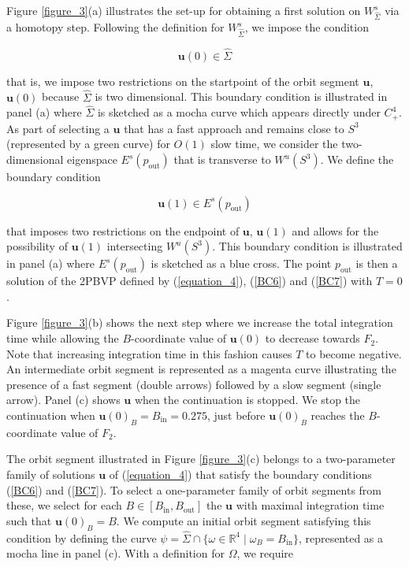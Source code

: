 \documentclass{ws-ijbc}
\begin{document}
Figure \ref{figure_3}(a) illustrates the set-up for obtaining a first solution on $W^s_{\widehat{\Sigma}}$ via a homotopy step.  Following the definition for $W^s_{\widehat{\Sigma}}$, we impose the condition
    
\begin{equation}
\mathbf{u}(0) \in \widehat{\Sigma}
\label{BC6}
\end{equation}
    
 \noindent
that is, we impose two restrictions on the startpoint of the orbit segment $\mathbf{u}$, $\mathbf{u}(0)$ because $\widehat{\Sigma}$ is two dimensional.  This boundary condition is illustrated in panel (a) where $\widehat{\Sigma}$ is sketched as a mocha curve which appears directly under $C^4_+$.  As part of selecting a $\mathbf{u}$ that has a fast approach and remains close to $S^3$ (represented by a green curve) for $O(1)$ slow time, we consider the two-dimensional eigenspace $E^s(p_{\text{out}})$ that is transverse to $W^u(S^3)$.  We define the boundary condition
 
\begin{equation}
\mathbf{u}(1) \in E^s(p_{\text{out}})
\label{BC7}
\end{equation}
    
\noindent
that imposes two restrictions on the endpoint of $\mathbf{u}$, $\mathbf{u}(1)$ and allows for the possibility of $\mathbf{u}(1)$ intersecting $W^u(S^3)$.  This boundary condition is illustrated in panel (a) where $E^s(p_{\text{out}})$ is sketched as a blue cross.  The point $p_{\text{out}}$ is then a solution of the 2PBVP defined by (\ref{equation_4}), (\ref{BC6}) and (\ref{BC7}) with $T=0$.

Figure \ref{figure_3}(b) shows the next step where we increase the total integration time while allowing the $B$-coordinate value of $\mathbf{u}(0)$ to decrease towards $F_2$.  Note that increasing integration time in this fashion causes $T$ to become negative.  An intermediate orbit segment is represented as a magenta curve illustrating the presence of a fast segment (double arrows) followed by a slow segment (single arrow).  Panel (c) shows $\mathbf{u}$ when the continuation is stopped.  We stop the continuation when $\mathbf{u}(0)_B = B_{\text{in}}=0.275$, just before $\mathbf{u}(0)_B$ reaches the $B$-coordinate value of $F_2$.
    
The orbit segment illustrated in Figure \ref{figure_3}(c) belongs to a two-parameter family of solutions $\mathbf{u}$ of (\ref{equation_4}) that satisfy the boundary conditions (\ref{BC6}) and (\ref{BC7}).  To select a one-parameter family of orbit segments from these, we select for each $B \in [B_{\text{in}}, B_{\text{out}}]$ the $\mathbf{u}$ with maximal integration time such that $\mathbf{u}(0)_B=B$.  We compute an initial orbit segment satisfying this condition by defining the curve $\psi = \widehat{\Sigma}\cap \{ \omega \in \mathbb{R}^4 \; | \; \omega_B = B_{\text{in}}\}$, represented as a mocha line in panel (c).  With a definition for $\Omega$, we require
    
\end{document}
